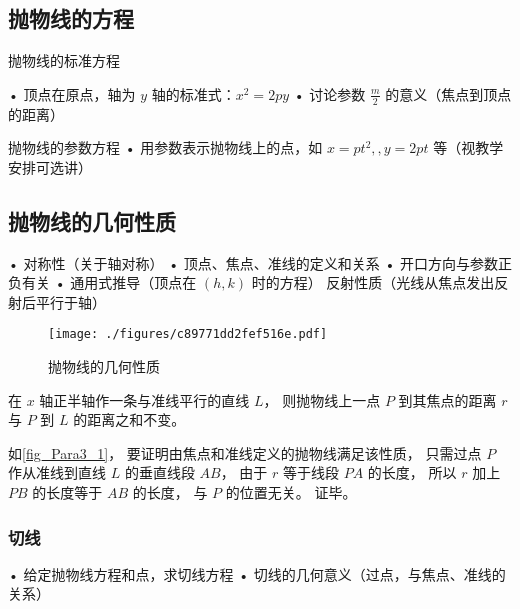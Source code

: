 \subsection{抛物线的方程}

\begin{theorem}{抛物线的标准方程}

\end{theorem}
	•	顶点在原点，轴为 $y$ 轴的标准式：$x^2=2py$
	•	讨论参数 $\displaystyle\frac{m}{2}$ 的意义（焦点到顶点的距离）
\begin{theorem}{抛物线的参数方程}
	•	用参数表示抛物线上的点，如 $x=pt^2,,y=2pt$ 等（视教学安排可选讲）
\end{theorem}





\subsection{抛物线的几何性质}
	•	对称性（关于轴对称）
	•	顶点、焦点、准线的定义和关系
	•	开口方向与参数正负有关
	•	通用式推导（顶点在 $(h,k)$ 时的方程）
    反射性质（光线从焦点发出反射后平行于轴）

\begin{figure}[ht]
\centering
\texttt{[image: ./figures/c89771dd2fef516e.pdf]}
\caption{抛物线的几何性质} \label{fig_Para3_1}
\end{figure}

在 $x$ 轴正半轴作一条与准线平行的直线 $L$， 则抛物线上一点 $P$ 到其焦点的距离 $r$ 与 $P$ 到 $L$ 的距离之和不变。

如\autoref{fig_Para3_1}， 要证明由焦点和准线定义的抛物线满足该性质， 只需过点 $P$ 作从准线到直线 $L$ 的垂直线段 $AB$， 由于 $r$ 等于线段 $PA$ 的长度， 所以 $r$ 加上 $PB$ 的长度等于 $AB$ 的长度， 与 $P$ 的位置无关。 证毕。
\subsubsection{切线}
	•	给定抛物线方程和点，求切线方程
	•	切线的几何意义（过点，与焦点、准线的关系）
